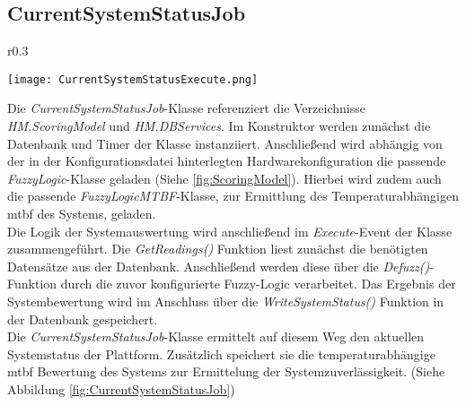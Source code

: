 \subsection{CurrentSystemStatusJob}
\begin{wrapfigure}{r}{0.3\textwidth}
  \captionsetup{justification=centering,format=plain, font=small}
    \vspace{-1.2cm}
    \begin{center}
      \texttt{[image: CurrentSystemStatusExecute.png]}
    \end{center}
    \vspace{-0.5cm}
    \caption{Ablaufdiagram des Execute Events der \textit{CurrentSystemStatusJob}-Klasse}
    \label{fig:CurrentSystemStatusJob}
  \end{wrapfigure}
Die \textit{CurrentSystemStatusJob}-Klasse referenziert die Verzeichnisse \textit{HM.ScoringModel} und \textit{HM.DBServices}. Im Konstruktor werden zunächst die Datenbank und Timer der Klasse instanziiert. Anschließend wird abhängig von der in der Konfigurationsdatei hinterlegten Hardwarekonfiguration die passende \textit{FuzzyLogic}-Klasse geladen (Siehe \ref{fig:ScoringModel}). Hierbei wird zudem auch die passende \textit{FuzzyLogicMTBF}-Klasse, zur Ermittlung des Temperaturabhängigen \ac{mtbf} des Systems, geladen.\\
Die Logik der Systemauswertung wird anschließend im \textit{Execute}-Event der Klasse zusammengeführt. Die \textit{GetReadings()} Funktion liest zunächst die benötigten Datensätze aus der Datenbank. Anschließend werden diese über die \textit{Defuzz()}-Funktion durch die zuvor konfigurierte Fuzzy-Logic verarbeitet. Das Ergebnis der Systembewertung wird im Anschluss über die \textit{WriteSystemStatus()} Funktion in der Datenbank gespeichert.\\
Die \textit{CurrentSystemStatusJob}-Klasse ermittelt auf diesem Weg den aktuellen Systemstatus der Plattform. Zusätzlich speichert sie die temperaturabhängige \ac{mtbf} Bewertung des Systems zur Ermittelung der Systemzuverlässigkeit. (Siehe Abbildung \ref{fig:CurrentSystemStatusJob})


